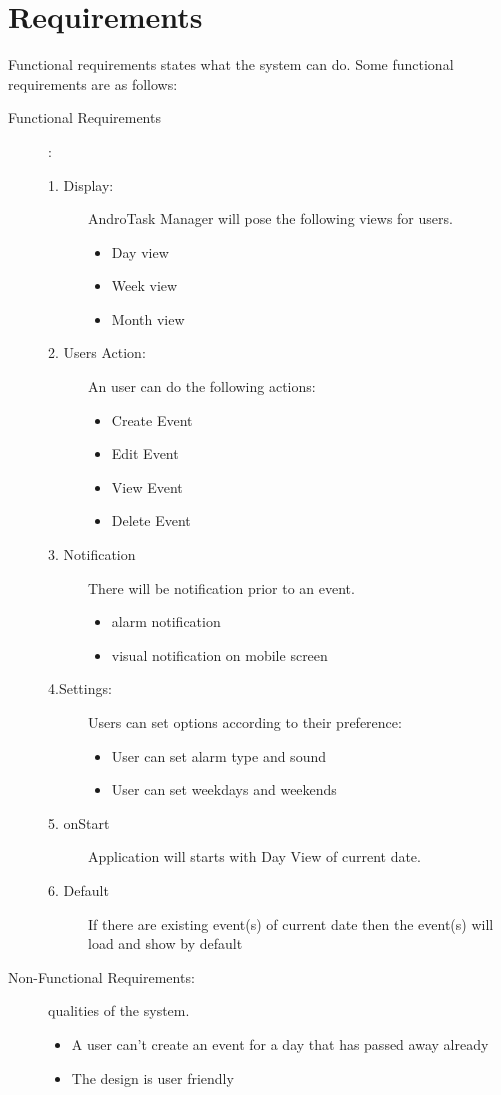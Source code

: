 \documentclass[10pt,a4paper]{report}
\begin{document}
\section{Requirements}
Functional requirements states what the system can do. Some functional requirements are as follows:
\begin{description}
\item[Functional Requirements]: \\

\begin{description}
 \item[1. Display:] AndroTask Manager will pose the following views for users.  
   \begin{itemize}
     \item Day view
     \item Week view
     \item Month view 
     \end{itemize}
 \item[2. Users Action:] An user can do the following actions:  
   \begin{itemize}
     \item Create Event
     \item Edit Event
     \item View Event
     \item Delete Event    
   \end{itemize}
  \item[3. Notification] There will be notification prior to an event.  
   \begin{itemize}
     \item alarm notification
     \item visual notification on mobile screen
   \end{itemize}
  \item[4.Settings:] Users can set options according to their preference:
    \begin{itemize}
     \item User can set alarm type and sound
     \item User can set weekdays and weekends
   \end{itemize}
  \item[5. onStart] Application will starts with Day View of current date.
  \item[6. Default] If there are existing event(s) of current date then the event(s) will load and show by default
 \end{description}
 \item[Non-Functional Requirements:] qualities of the system.
   \begin{itemize}
     \item A user can’t create an event for a day that has passed away already
     \item The design is user friendly
   \end{itemize}
 
 
\end{description}
\end{document}
